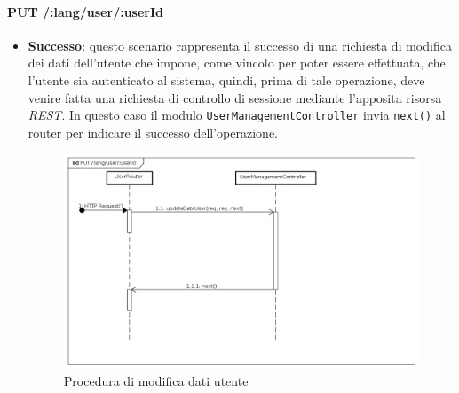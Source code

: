 \paragraph{PUT /:lang/user/:userId}
\begin{itemize}
\item \textbf{Successo}: questo scenario rappresenta il successo di una richiesta di modifica dei dati dell'utente che impone, come vincolo per poter essere effettuata, che l'utente sia autenticato al sistema, quindi, prima di tale operazione, deve venire fatta una richiesta di controllo di sessione mediante l'apposita risorsa \textit{REST}. 
In questo caso il modulo \texttt{UserManagementController} invia \texttt{next()} al router per indicare il successo dell'operazione.
\label{Procedura di modifica dati utente}
\begin{figure}[ht]
	\centering
	\includegraphics[scale=0.40]{UML/DiagrammiDiSequenza/Back-end/PUT_LangUserUseridSuccess.png}
	\caption{Procedura di modifica dati utente}
\end{figure}
\FloatBarrier


\end{itemize}
